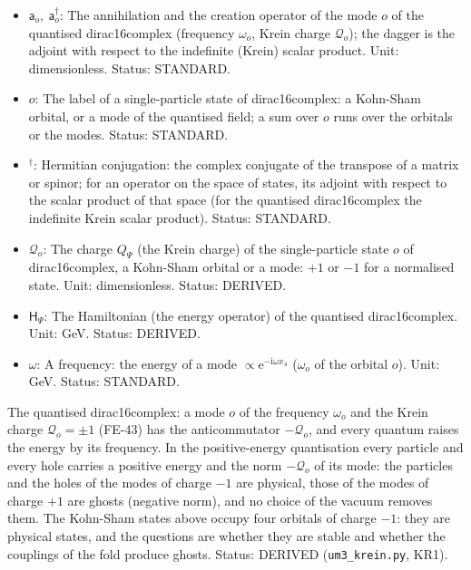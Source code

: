 \documentclass[
  10pt,
]{article}
\providecommand{\tightlist}{%
  \setlength{\itemsep}{0pt}\setlength{\parskip}{0pt}}
\begin{document}
\begin{itemize}
\tightlist
\item
  \(\mathsf{a}_o,\ \mathsf{a}_o^\dagger\): The annihilation and the
  creation operator of the mode \(o\) of the quantised dirac16complex
  (frequency \(\omega_o\), Krein charge \(\mathcal{Q}_o\)); the dagger
  is the adjoint with respect to the indefinite (Krein) scalar product.
  Unit: dimensionless. Status: STANDARD.
\item
  \(o\): The label of a single-particle state of dirac16complex: a
  Kohn-Sham orbital, or a mode of the quantised field; a sum over \(o\)
  runs over the orbitals or the modes. Status: STANDARD.
\item
  \({}^\dagger\): Hermitian conjugation: the complex conjugate of the
  transpose of a matrix or spinor; for an operator on the space of
  states, its adjoint with respect to the scalar product of that space
  (for the quantised dirac16complex the indefinite Krein scalar
  product). Status: STANDARD.
\item
  \(\mathcal{Q}_o\): The charge \(Q_\Psi\) (the Krein charge) of the
  single-particle state \(o\) of dirac16complex, a Kohn-Sham orbital or
  a mode: \(+1\) or \(-1\) for a normalised state. Unit: dimensionless.
  Status: DERIVED.
\item
  \(\mathsf{H}_\Psi\): The Hamiltonian (the energy operator) of the
  quantised dirac16complex. Unit: GeV. Status: DERIVED.
\item
  \(\omega\): A frequency: the energy of a mode
  \(\propto \mathrm{e}^{-\mathrm{i}\omega x_4}\) (\(\omega_o\) of the
  orbital \(o\)). Unit: GeV. Status: STANDARD.
\end{itemize}

The quantised dirac16complex: a mode \(o\) of the frequency \(\omega_o\)
and the Krein charge \(\mathcal{Q}_o = \pm1\) (FE-43) has the
anticommutator \(-\mathcal{Q}_o\), and every quantum raises the energy
by its frequency. In the positive-energy quantisation every particle and
every hole carries a positive energy and the norm \(-\mathcal{Q}_o\) of
its mode: the particles and the holes of the modes of charge \(-1\) are
physical, those of the modes of charge \(+1\) are ghosts (negative
norm), and no choice of the vacuum removes them. The Kohn-Sham states
above occupy four orbitals of charge \(-1\): they are physical states,
and the questions are whether they are stable and whether the couplings
of the fold produce ghosts. Status: DERIVED (\texttt{um3\_krein.py},
KR1).
\end{document}
